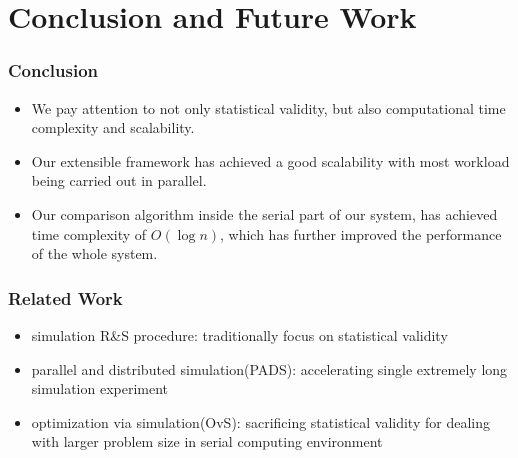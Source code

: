 \documentclass{beamer}
\begin{document}
\section{Conclusion and Future Work}

\begin{frame}
\frametitle{Conclusion}
\begin{itemize}
\item We pay attention to not only statistical validity, but also computational time complexity and scalability.
\vspace{\baselineskip}
\item Our extensible framework has achieved a good scalability with most workload being carried out in parallel.
\vspace{\baselineskip}
\item Our comparison algorithm inside the serial part of our system, has achieved time complexity of $O(\log n)$, which has further improved the performance of the whole system.
\end{itemize}
\end{frame}

\begin{frame}
\frametitle{Related Work}
\begin{itemize}
\item simulation R\&S procedure: traditionally focus on statistical validity
\vspace{\baselineskip}
\item parallel and distributed simulation(PADS): accelerating single extremely long simulation experiment
\vspace{\baselineskip}
\item optimization via simulation(OvS): sacrificing statistical validity for dealing with larger problem size in serial computing environment
\end{itemize}
\end{frame}
\end{document}
